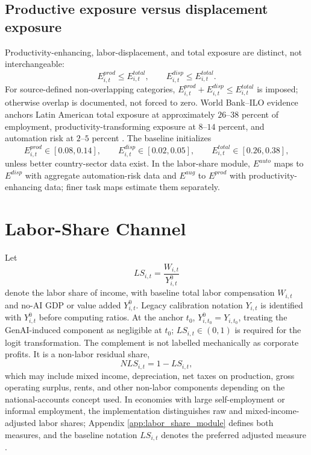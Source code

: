 \documentclass[11pt,a4paper]{article}
\begin{document}
\subsection{Productive exposure versus displacement exposure}\label{subsec:prod_disp_exposure_main}

Productivity-enhancing, labor-displacement, and total exposure are distinct, not interchangeable:
\begin{equation}
    E^{prod}_{i,t}\leq E^{total}_{i,t},\qquad E^{disp}_{i,t}\leq E^{total}_{i,t}.
\end{equation}
For source-defined non-overlapping categories, $E^{prod}_{i,t}+E^{disp}_{i,t}\leq E^{total}_{i,t}$ is imposed; otherwise overlap is documented, not forced to zero. World Bank--ILO evidence anchors Latin American total exposure at approximately $26$--$38$ percent of employment, productivity-transforming exposure at $8$--$14$ percent, and automation risk at $2$--$5$ percent \citep{worldbankilo2024lacgenai}. The baseline initializes
\begin{equation}
    E^{prod}_{i,t}\in[0.08,0.14],\qquad
    E^{disp}_{i,t}\in[0.02,0.05],\qquad
    E^{total}_{i,t}\in[0.26,0.38],
\end{equation}
unless better country-sector data exist. In the labor-share module, $E^{auto}$ maps to $E^{disp}$ with aggregate automation-risk data and $E^{aug}$ to $E^{prod}$ with productivity-enhancing data; finer task maps estimate them separately.

\section{Labor-Share Channel}\label{sec:labor_share}

Let
\begin{equation}
    LS_{i,t}=\frac{W_{i,t}}{Y^0_{i,t}}
\end{equation}
denote the labor share of income, with baseline total labor compensation $W_{i,t}$ and no-AI GDP or value added $Y^0_{i,t}$. Legacy calibration notation $Y_{i,t}$ is identified with $Y^0_{i,t}$ before computing ratios. At the anchor $t_0$, $Y^0_{i,t_0}=Y_{i,t_0}$, treating the GenAI-induced component as negligible at $t_0$; $LS_{i,t}\in(0,1)$ is required for the logit transformation.
The complement is not labelled mechanically as corporate profits. It is a non-labor residual share,
\begin{equation}
    NLS_{i,t}=1-LS_{i,t},
\end{equation}
which may include mixed income, depreciation, net taxes on production, gross operating surplus, rents, and other non-labor components depending on the national-accounts concept used. In economies with large self-employment or informal employment, the implementation distinguishes raw and mixed-income-adjusted labor shares; Appendix \ref{app:labor_share_module} defines both measures, and the baseline notation $LS_{i,t}$ denotes the preferred adjusted measure \citep{gollin2002getting}.
\end{document}
